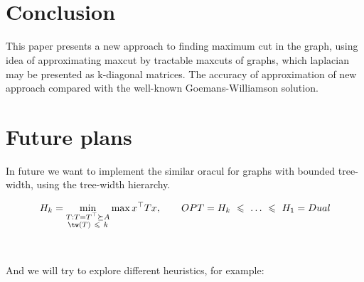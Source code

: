 \documentclass{article}
\renewcommand{\le}{\ \leqslant\ }
\begin{document}
\begin{figure}[!htbp]

   \hspace{0.05\textwidth} %
  \\
   \hspace{0.05\textwidth} %
  \\
   \hspace{0.05\textwidth} %
  

\end{figure}
\newpage





\section{Conclusion}
This paper presents a new approach to finding maximum cut in the graph, using idea of approximating maxcut by tractable maxcuts of graphs, which laplacian may be presented as k-diagonal matrices. The accuracy of approximation of new approach compared with the well-known Goemans-Williamson solution.

\section{Future plans}
In future we want to implement the similar oracul for graphs with bounded tree-width, using the tree-width hierarchy.

\[H_k = \min_{\substack{T: T = T^\top \succeq A\\ \tw(T) \le k}} \max x^\top T x,\qquad OPT = H_k \le \dots \le H_1 = Dual \]
\vspace{0.8 cm}
\\
\\
And we will try to explore different heuristics, for example:
\end{document}
